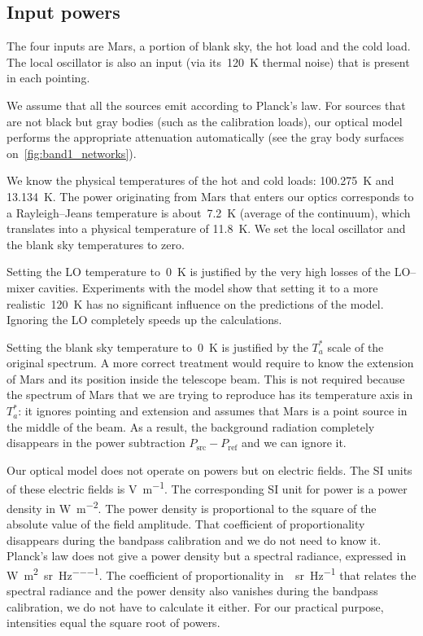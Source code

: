 
\subsection{Input powers}
The four inputs are Mars, a portion of blank sky, the hot load and the cold load.
The local oscillator is also an input (via its~\SI{120}{\kelvin} thermal noise) that is present in each pointing.

We assume that all the sources emit according to Planck's law.
For sources that are not black but gray bodies (such as the calibration loads), our optical model performs the appropriate attenuation automatically (see the gray body surfaces on~\cref{fig:band1_networks}).

We know the physical temperatures of the hot and cold loads:
\SI{100.275}{\kelvin} and \SI{13.134}{\kelvin}.
The power originating from Mars that enters our optics corresponds to a Rayleigh--Jeans temperature is about~\SI{7.2}{\kelvin} (average of the continuum), which translates into a physical temperature of \SI{11.8}{\kelvin}.
We set the local oscillator and the blank sky temperatures to zero.

Setting the LO temperature to~\SI{0}{\kelvin} is justified by the very high losses of the LO--mixer cavities.
Experiments with the model show that setting it to a more realistic~\SI{120}{\kelvin} has no significant influence on the predictions of the model.
Ignoring the LO completely speeds up the calculations.

Setting the blank sky temperature to~\SI{0}{\kelvin} is justified by the $T_a^*$ scale of the original spectrum.
A more correct treatment would require to know the extension of Mars and its position inside the telescope beam.
This is not required because the spectrum of Mars that we are trying to reproduce has its temperature axis in $T_a^*$: it ignores pointing and extension and assumes that Mars is a point source in the middle of the beam.
As a result, the background radiation completely disappears in the power subtraction $P_\text{src}-P_\text{ref}$ and we can ignore it.

Our optical model does not operate on powers but on electric fields.
The SI units of these electric fields is \si{\volt\per\meter}.
The corresponding SI unit for power is a power density in \si{\watt\per\meter\squared}.
The power density is proportional to the square of the absolute value of the field amplitude.
That coefficient of proportionality disappears during the bandpass calibration and we do not need to know it.
Planck's law does not give a power density but a spectral radiance, expressed in
\si{\watt\per\meter\squared\per\steradian\per\hertz}.
The coefficient of proportionality in~\si{\per\steradian\per\hertz} that relates the spectral radiance and the power density also vanishes during the bandpass calibration, we do not have to calculate it either.
For our practical purpose, intensities equal the square root of powers.

